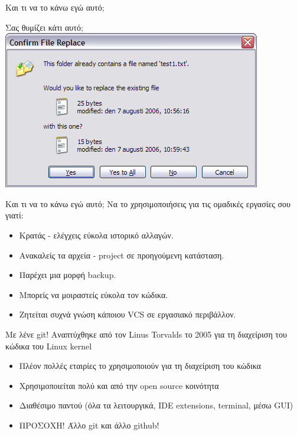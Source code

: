 \documentclass{beamer}
\begin{document}
\begin{frame}{Και τι να το κάνω εγώ αυτό;}
 \begin{center}
    Σας θυμίζει κάτι αυτό;\\
    \includegraphics[scale=0.45]{replace.png}
  \end{center}
\end{frame}

\begin{frame}{Και τι να το κάνω εγώ αυτό;}
 Να το χρησιμοποιήσεις για τις ομαδικές εργασίες σου γιατί:
  \begin{itemize}
    \item Κρατάς - ελέγχεις εύκολα ιστορικό αλλαγών.
    \pause
    \item Ανακαλείς τα αρχεία - project σε προηγούμενη κατάσταση.
    \pause
    \item Παρέχει μια μορφή backup.
    \pause
    \item Μπορείς να μοιραστείς εύκολα τον κώδικα.
    \pause
    \item Ζητείται συχνά γνώση κάποιου VCS σε εργασιακό περιβάλλον.
  \end{itemize}
\end{frame}

\begin{frame}{Με λένε git!}
 Αναπτύχθηκε από τον Linus Torvalds το 2005 για τη διαχείριση του κώδικα του Linux kernel
  \begin{itemize}
    \item Πλέον πολλές εταιρίες το χρησιμοποιούν για τη διαχείριση του κώδικα
    \pause
    \item Χρησιμοποιείται πολύ και από την open source κοινότητα
    \pause
    \item Διαθέσιμο παντού (όλα τα λειτουργικά, IDE extensions, terminal, μέσω GUI)
    \pause
    \item ΠΡΟΣΟΧΗ! Άλλο git και άλλο github!
  \end{itemize}
\end{frame}
\end{document}
